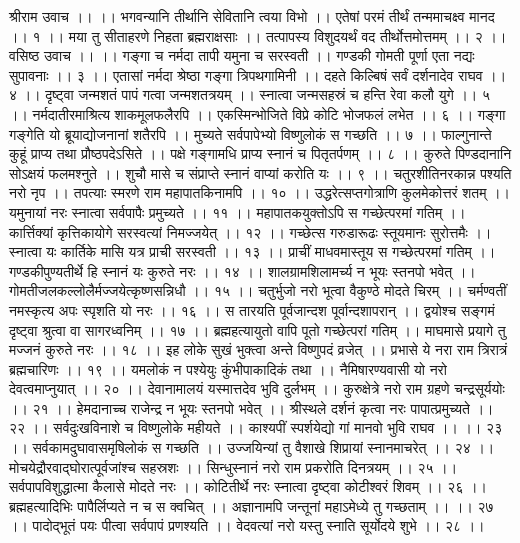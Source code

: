 श्रीराम उवाच ।। ।।
भगवन्यानि तीर्थानि सेवितानि त्वया विभो ।।
एतेषां परमं तीर्थं तन्ममाचक्ष्व मानद ।। १ ।।
मया तु सीताहरणे निहता ब्रह्मराक्षसाः ।।
तत्पापस्य विशुदयर्थं वद तीर्थोत्तमोत्तमम् ।। २ ।।
वसिष्ठ उवाच ।। ।।
गङ्गा च नर्मदा तापी यमुना च सरस्वती ।।
गण्डकी गोमती पूर्णा एता नद्यः सुपावनाः ।। ३ ।।
एतासां नर्मदा श्रेष्ठा गङ्गा त्रिपथगामिनी ।।
दहते किल्बिषं सर्वं दर्शनादेव राघव ।। ४ ।।
दृष्ट्वा जन्मशतं पापं गत्वा जन्मशतत्रयम् ।।
स्नात्वा जन्मसहस्रं च हन्ति रेवा कलौ युगे ।। ५ ।।
नर्मदातीरमाश्रित्य शाकमूलफलैरपि ।।
एकस्मिन्भोजिते विप्रे कोटि भोजफलं लभेत ।। ६ ।।
गङ्गा गङ्गेति यो ब्रूयाद्योजनानां शतैरपि ।।
मुच्यते सर्वपापेभ्यो विष्णुलोकं स गच्छति ।। ७ ।।
फाल्गुनान्ते कुहूं प्राप्य तथा प्रौष्ठपदेऽसिते ।।
पक्षे गङ्गामधि प्राप्य स्नानं च पितृतर्पणम् ।। ८ ।।
कुरुते पिण्डदानानि सोऽक्षयं फलमश्नुते ।।
शुचौ मासे च संप्राप्ते स्नानं वाप्यां करोति यः ।। ९ ।।
चतुरशीतिनरकान्न पश्यति नरो नृप ।।
तपत्याः स्मरणे राम महापातकिनामपि ।। १० ।।
उद्धरेत्सप्तगोत्राणि कुलमेकोत्तरं शतम् ।।
यमुनायां नरः स्नात्वा सर्वपापैः प्रमुच्यते ।। ११ ।।
महापातकयुक्तोऽपि स गच्छेत्परमां गतिम् ।।
कार्त्तिक्यां कृत्तिकायोगे सरस्वत्यां निमज्जयेत् ।। १२ ।।
गच्छेत्स गरुडारूढः स्तूयमानः सुरोत्तमैः ।।
स्नात्वा यः कार्तिके मासि यत्र प्राची सरस्वती ।। १३ ।।
प्राचीं माधवमास्तूय स गच्छेत्परमां गतिम् ।।
गण्डकीपुण्यतीर्थे हि स्नानं यः कुरुते नरः ।। १४ ।।
शालग्रामशिलामर्च्य न भूयः स्तनपो भवेत् ।।
गोमतीजलकल्लोलैर्मज्जयेत्कृष्णसन्निधौ ।। १५ ।।
चतुर्भुजो नरो भूत्वा वैकुण्ठे मोदते चिरम् ।।
चर्मण्वतीं नमस्कृत्य अपः स्पृशति यो नरः ।। १६ ।।
स तारयति पूर्वजान्दश पूर्वान्दशापरान् ।।
द्वयोश्च सङ्गमं दृष्ट्वा श्रुत्वा वा सागरध्वनिम् ।। १७ ।।
ब्रह्महत्यायुतो वापि पूतो गच्छेत्परां गतिम् ।।
माघमासे प्रयागे तु मज्जनं कुरुते नरः ।। १८ ।।
इह लोके सुखं भुक्त्वा अन्ते विष्णुपदं व्रजेत् ।।
प्रभासे ये नरा राम त्रिरात्रं ब्रह्मचारिणः ।। १९ ।।
यमलोकं न पश्येयुः कुंभीपाकादिकं तथा ।।
नैमिषारण्यवासी यो नरो देवत्वमाप्नुयात् ।। २० ।।
देवानामालयं यस्मात्तदेव भुवि दुर्लभम् ।।
कुरुक्षेत्रे नरो राम ग्रहणे चन्द्रसूर्ययोः ।। २१ ।।
हेमदानाच्च राजेन्द्र न भूयः स्तनपो भवेत् ।।
श्रीस्थले दर्शनं कृत्वा नरः पापात्प्रमुच्यते ।। २२ ।।
सर्वदुःखविनाशे च विष्णुलोके महीयते ।।
काश्यपीं स्पर्शयेद्यो गां मानवो भुवि राघव ।। ।। २३ ।।
सर्वकामदुघावासमृषिलोकं स गच्छति ।।
उज्जयिन्यां तु वैशाखे शिप्रायां स्नानमाचरेत् ।। २४ ।।
मोचयेद्रौरवाद्घोरात्पूर्वजांश्च सहस्रशः ।।
सिन्धुस्नानं नरो राम प्रकरोति दिनत्रयम् ।। २५ ।।
सर्वपापविशुद्धात्मा कैलासे मोदते नरः ।।
कोटितीर्थे नरः स्नात्वा दृष्ट्वा कोटीश्वरं शिवम् ।। २६ ।।
ब्रह्महत्यादिभिः पापैर्लिप्यते न च स क्वचित् ।।
अज्ञानामपि जन्तूनां महाऽमेध्ये तु गच्छताम् ।। ।। २७ ।।
पादोद्भूतं पयः पीत्वा सर्वपापं प्रणश्यति ।।
वेदवत्यां नरो यस्तु स्नाति सूर्योदये शुभे ।। २८ ।।
